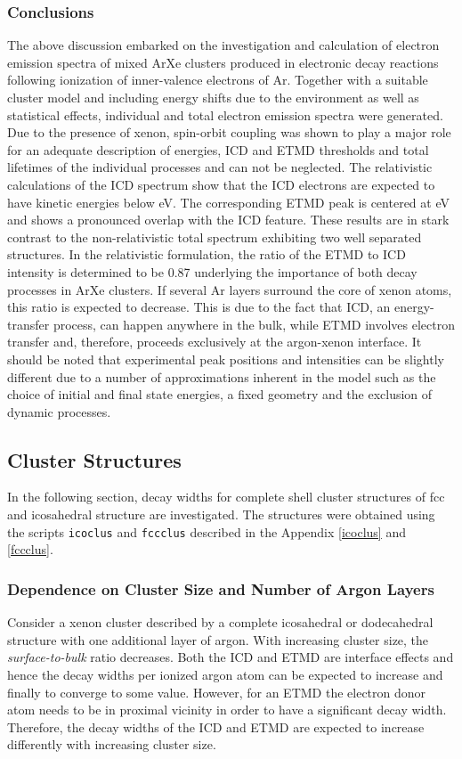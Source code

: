 \subsubsection{Conclusions}
The above discussion embarked on the investigation and calculation of electron
emission spectra of mixed ArXe clusters produced in electronic decay reactions
following ionization of inner-valence electrons of Ar.
Together with a suitable cluster model and including
energy shifts due to the environment as well as statistical effects,
individual and total electron emission spectra were generated. Due to the
presence of xenon, spin-orbit coupling was shown to play a major role for an
adequate description of energies, ICD and ETMD thresholds and total lifetimes
of the individual processes and can not be neglected. The  relativistic
calculations of the ICD spectrum show that the ICD electrons are expected to
have kinetic energies below \unit[2]{eV}. The corresponding ETMD peak is
centered at \unit[2]{eV} and shows a pronounced overlap with the ICD feature.
These results are in stark contrast to the non-relativistic total spectrum
exhibiting two well separated structures. In the relativistic formulation,
the ratio of the ETMD to ICD intensity is determined to be 0.87 underlying the
importance of both decay processes in ArXe clusters.
If several Ar layers surround the core of xenon atoms,
this ratio is expected to decrease.
This is due to the fact that ICD, an energy-transfer process, can happen
anywhere in the bulk, while ETMD involves electron transfer and, therefore,
proceeds exclusively at the argon-xenon interface. It should be noted that
experimental peak positions and intensities can be slightly different due to
a number of approximations inherent in the model such as the choice of initial
and final state energies, a fixed geometry and
the exclusion of dynamic processes.



\subsection{Cluster Structures}
In the following section, decay widths for complete shell cluster structures
of \ac{fcc} and icosahedral structure are investigated. The structures were
obtained using the scripts \verb|icoclus| and \verb|fccclus| described in
the Appendix \ref{icoclus} and \ref{fccclus}.

\subsubsection{Dependence on Cluster Size and Number of Argon Layers}
Consider a xenon cluster described by a complete icosahedral or dodecahedral
structure with one additional layer of argon. With increasing cluster size,
the \emph{surface-to-bulk} ratio decreases. Both the \ac{ICD} and \ac{ETMD}
are interface
effects and hence the decay widths per ionized argon atom can be expected
to increase and finally
to converge to some value. However, for an \ac{ETMD} the electron donor atom
needs to be in proximal vicinity in order to have a significant decay
width. Therefore, the decay widths of the ICD and ETMD are expected to increase
differently with increasing cluster size.

